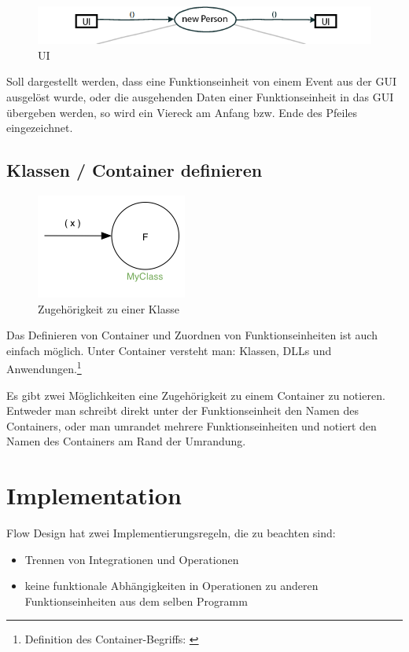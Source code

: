 \begin{figure}[H]
	\centering
		\includegraphics[width=.9\linewidth]{./img/diagramUI.png}
	\caption{UI}
\end{figure}


Soll dargestellt werden, dass eine Funktionseinheit von einem Event aus der GUI ausgelöst
wurde, oder die ausgehenden Daten einer Funktionseinheit in das GUI übergeben werden, so
wird ein Viereck am Anfang bzw. Ende des Pfeiles eingezeichnet.

\section{Klassen / Container definieren}


\begin{figure}[H]
	\centering
	\includegraphics[width=.4\linewidth]{./img/diagramClass.png}
	\caption{Zugehörigkeit zu einer Klasse}
\end{figure}


Das Definieren von Container und Zuordnen von Funktionseinheiten ist auch
einfach möglich. Unter Container versteht man: Klassen, DLLs und Anwendungen.\footnote{Definition des Container-Begriffs: \cite[S. 50 ff.]{schummelzettel}}

Es gibt zwei Möglichkeiten eine Zugehörigkeit zu einem Container zu notieren.
Entweder man schreibt direkt unter der Funktionseinheit den Namen des
Containers, oder man umrandet mehrere Funktionseinheiten und notiert den Namen
des Containers am Rand der Umrandung.

\chapter{Implementation}


Flow Design hat zwei Implementierungsregeln, die zu beachten sind:

\begin{itemize}
\item Trennen von Integrationen und Operationen
\item keine funktionale Abhängigkeiten in Operationen zu anderen Funktionseinheiten aus dem selben Programm
\end{itemize}

